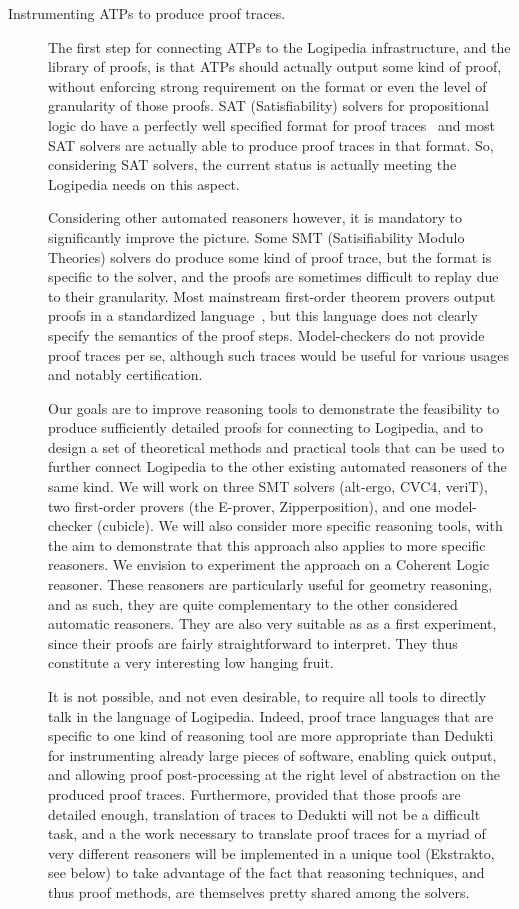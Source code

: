 \begin{description}
\item[Instrumenting ATPs to produce proof traces.] The first step for connecting ATPs to the Logipedia infrastructure, and the library of proofs, is that ATPs should actually output some kind of proof, without enforcing strong requirement on the format or even the level of granularity of those proofs.  SAT (Satisfiability) solvers for propositional logic do have a perfectly well specified format for proof traces~\cite{TODO} and most SAT solvers are actually able to produce proof traces in that format.  So, considering SAT solvers, the current status is actually meeting the Logipedia needs on this aspect.

  Considering other automated reasoners however, it is mandatory to significantly improve the picture.  Some SMT (Satisifiability Modulo Theories) solvers do produce some kind of proof trace, but the format is specific to the solver, and the proofs are sometimes difficult to replay due to their granularity.  Most mainstream first-order theorem provers output proofs in a standardized language~\cite{TODO}, but this language does not clearly specify the semantics of the proof steps.  Model-checkers do not provide proof traces per se, although such traces would be useful for various usages and notably certification.

  Our goals are to improve reasoning tools to demonstrate the feasibility to
  produce sufficiently detailed proofs for connecting to Logipedia, and to
  design a set of theoretical methods and practical tools that can be used to
  further connect Logipedia to the other existing automated reasoners of the
  same kind.  We will work on three SMT solvers (alt-ergo, CVC4, veriT), two
  first-order provers (the E-prover, Zipperposition), and one model-checker
  (cubicle).  We will also consider more specific reasoning tools, with the aim
  to demonstrate that this approach also applies to more specific reasoners.  We
  envision to experiment the approach on a Coherent Logic reasoner.  These
  reasoners are particularly useful for geometry reasoning, and as such, they
  are quite complementary to the other considered automatic reasoners.  They are
  also very suitable as as a first experiment, since their proofs are fairly
  straightforward to interpret.  They thus constitute a very interesting low
  hanging fruit.
  
  It is not possible, and not even desirable, to require all tools to directly
  talk in the language of Logipedia.  Indeed, proof trace languages that are
  specific to one kind of reasoning tool are more appropriate than Dedukti for
  instrumenting already large pieces of software, enabling quick output, and
  allowing proof post-processing at the right level of abstraction on the
  produced proof traces.  Furthermore, provided that those proofs are detailed
  enough, translation of traces to Dedukti will not be a difficult task, and a
  the work necessary to translate proof traces for a myriad of very different
  reasoners will be implemented in a unique tool (Ekstrakto, see below) to take
  advantage of the fact that reasoning techniques, and thus proof methods, are
  themselves pretty shared among the solvers.


\end{description}
